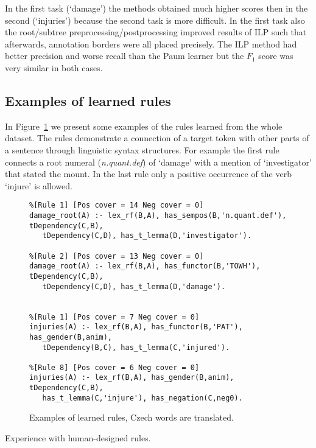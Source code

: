 In the first task (`damage') the methods obtained much higher scores then in the second (`injuries') because the second task is more difficult. In the first task also the root/subtree preprocessing/postprocessing improved results of ILP such that afterwards, annotation borders were all placed precisely. The ILP method had better precision and worse recall than the Paum learner but the $F_1$ score was very similar in both cases.

\subsection{Examples of learned rules}

In Figure~\ref{fig:rules} we present some examples of the rules learned from the whole dataset. The rules demonstrate a connection of a target token with other parts of a sentence through linguistic syntax structures. For example the first rule connects a root numeral (\emph{n.quant.def}) of `damage' with a mention of `investigator' that stated the mount. In the last rule only a positive occurrence of the verb `injure' is allowed.

\begin{figure}
\begin{verbatim}
%[Rule 1] [Pos cover = 14 Neg cover = 0]
damage_root(A) :- lex_rf(B,A), has_sempos(B,'n.quant.def'), tDependency(C,B),
   tDependency(C,D), has_t_lemma(D,'investigator').

%[Rule 2] [Pos cover = 13 Neg cover = 0]
damage_root(A) :- lex_rf(B,A), has_functor(B,'TOWH'), tDependency(C,B),
   tDependency(C,D), has_t_lemma(D,'damage').


%[Rule 1] [Pos cover = 7 Neg cover = 0]
injuries(A) :- lex_rf(B,A), has_functor(B,'PAT'), has_gender(B,anim),
   tDependency(B,C), has_t_lemma(C,'injured').

%[Rule 8] [Pos cover = 6 Neg cover = 0]
injuries(A) :- lex_rf(B,A), has_gender(B,anim), tDependency(C,B),
   has_t_lemma(C,'injure'), has_negation(C,neg0).
\end{verbatim}
	\caption{Examples of learned rules, Czech words are translated.}
	\label{fig:rules}
\end{figure}





Experience with human-designed rules.










